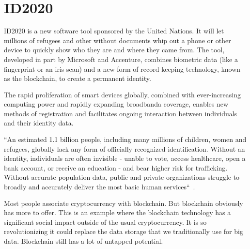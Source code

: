 \section{ID2020}

ID2020 is a new software tool sponsored 
by the United Nations. It will
let millions of refugees and other 
without documents whip out a phone
or other device to quickly show who
they are and where they came
from. The tool, developed in part 
by Microsoft and Accenture, combines
biometric data (like a fingerprint or 
an iris scan) and a new form of
record-keeping technology, known as 
the blockchain, to create a
permanent identity.
 
The rapid proliferation of smart 
devices globally, combined with
ever-increasing computing power 
and rapidly expanding broadbanda
coverage, enables new methods of 
registration and facilitates ongoing
interaction between individuals and 
their identity data.
 
``An estimated 1.1 billion people, 
including many millions of
children, women and refugees, globally 
lack any form of officially recognized 
identification. Without an 
identity, individuals are often
invisible - unable to vote, access 
healthcare, open a bank account, or
receive an education - and bear higher 
risk for trafficking. Without
accurate population data, public and 
private organizations struggle to
broadly and accurately deliver the 
most basic human 
services``~\cite{hid-sp18-506-NoID}.

Most people associate cryptocurrency
with blockchain. But blockchain obviously 
has more to offer. This is an example where
the blockchain technology has a significant
social impact outside of the usual 
cryptocurrency. It is so revolutionizing it
could replace the data storage that we 
traditionally use for big data. Blockchain
still has  a lot of untapped potential.
